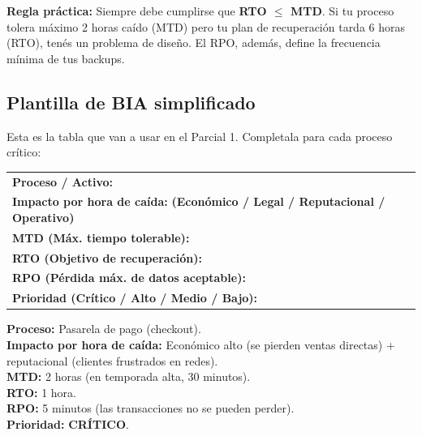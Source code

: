 \documentclass[12pt,a4paper]{article}
\renewcommand{\arraystretch}{1.25}
\begin{document}
\begin{cajaNota}
\textbf{Regla pr\'actica:} Siempre debe cumplirse que \textbf{RTO $\leq$ MTD}. Si tu proceso tolera m\'aximo 2 horas ca\'ido (MTD) pero tu plan de recuperaci\'on tarda 6 horas (RTO), ten\'es un problema de dise\~no. El RPO, adem\'as, define la frecuencia m\'inima de tus backups.
\end{cajaNota}

\subsection{Plantilla de BIA simplificado}

Esta es la tabla que van a usar en el Parcial 1. Completala para cada proceso cr\'itico:

\renewcommand{\arraystretch}{1.8}
\begin{tabularx}{\textwidth}{|X|}
\hline
\textbf{Proceso / Activo:} \hrulefill \\[4pt]
\textbf{Impacto por hora de ca\'ida:} \hrulefill \quad \textbf{(Econ\'omico / Legal / Reputacional / Operativo)} \\[4pt]
\textbf{MTD (M\'ax. tiempo tolerable):} \hrulefill \\[4pt]
\textbf{RTO (Objetivo de recuperaci\'on):} \hrulefill \\[4pt]
\textbf{RPO (P\'erdida m\'ax. de datos aceptable):} \hrulefill \\[4pt]
\textbf{Prioridad (Cr\'itico / Alto / Medio / Bajo):} \hrulefill \\[4pt]
\hline
\end{tabularx}

\begin{cajaActividad}[title={Ejemplo guiado: e-commerce de indumentaria}]
\textbf{Proceso:} Pasarela de pago (checkout).\\
\textbf{Impacto por hora de ca\'ida:} Econ\'omico alto (se pierden ventas directas) + reputacional (clientes frustrados en redes).\\
\textbf{MTD:} 2 horas (en temporada alta, 30 minutos).\\
\textbf{RTO:} 1 hora.\\
\textbf{RPO:} 5 minutos (las transacciones no se pueden perder).\\
\textbf{Prioridad:} \textbf{CR\'ITICO}.
\end{cajaActividad}

\newpage
\end{document}
